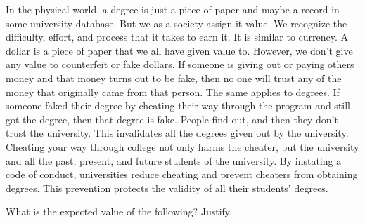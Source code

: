 \documentclass{article}
\begin{document}
In the physical world, a degree is just a piece of paper and maybe a record in some university database. But we as a society assign it value. We recognize the difficulty, effort, and process that it takes to earn it. It is similar to currency. A dollar is a piece of paper that we all have given value to. However, we don't give any value to counterfeit or fake dollars. If someone is giving out or paying others money and that money turns out to be fake, then no one will trust any of the money that originally came from that person. The same applies to degrees. If someone faked their degree by cheating their way through the program and still got the degree, then that degree is fake. People find out, and then they don't trust the university. This invalidates all the degrees given out by the university. Cheating your way through college not only harms the cheater, but the university and all the past, present, and future students of the university. By instating a code of conduct, universities reduce cheating and prevent cheaters from obtaining degrees. This prevention protects the validity of all their students' degrees.



 

What is the expected value of the following? Justify.
\end{document}
